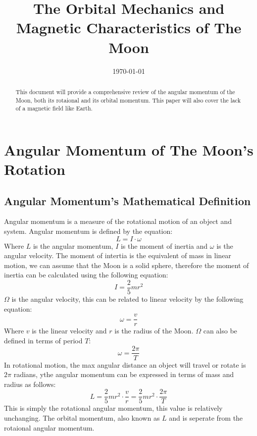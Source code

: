 \documentclass[12pt,oneside,a4paper,english]{article}
\author{}
\title{\textbf{The Orbital Mechanics and Magnetic Characteristics of The Moon}}
\date{\today}
\begin{document}
\maketitle
\begin{abstract}
    This document will provide a comprehensive review of the angular momentum of the Moon, both its rotaional and its orbital momentum. This paper will also cover the lack of a magnetic field like Earth.
\end{abstract}
\section{Angular Momentum of The Moon's Rotation}
\subsection{Angular Momentum's Mathematical Definition}
Angular momentum is a measure of the rotational motion of an object and system. Angular momentum is defined by the equation: 
\begin{equation}
    L = I \cdot \omega
    \label{angGen}
\end{equation}
Where \(L\) is the angular momentum, \(I\) is the moment of inertia and \(\omega\) is the angular velocity. The moment of intertia is the equivalent of mass in linear motion, we can assume that the Moon is a solid sphere, therefore the moment of inertia can be calculated using the following equation:
\begin{equation}
    I = \frac{2}{5} m r^2
    \label{inertiaEQ}
\end{equation}
\(\Omega\) is the angular velocity, this can be related to linear velocity by the following equation:
\begin{equation}
    \omega = \frac{v}{r}
\end{equation}
Where \(v\) is the linear velocity and \(r\) is the radius of the Moon. \(\Omega\) can also be defined in terms of period \(T\):
\begin{equation}
    \omega = \frac{2 \pi}{T}
\end{equation}
In rotational motion, the max angular distance an object will travel or rotate is \(2 \pi\) radians,
ythe angular momentum can be expressed in terms of mass and radius as follows:
\begin{equation}
    L = \frac{2}{5} m r^2 \cdot \frac{v}{r} = \frac{2}{5} m r^2 \cdot \frac{2 \pi}{T}
    \label{angularMom}
\end{equation}
This is simply the rotational angular momentum, this value is relatively unchanging. The orbital momentum, also known as $L$ and is seperate from the rotaional angular momentum.
\end{document}
